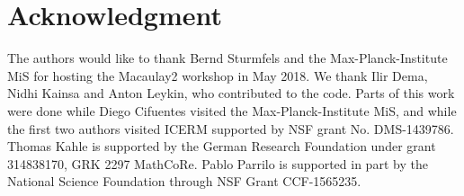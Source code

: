 \documentclass[11pt]{amsart}
\theoremstyle{plain}%
\theoremstyle{definition}
\theoremstyle{remark}
\newcommand{\Mac}{Macaulay2\xspace}
\begin{document}
\section*{Acknowledgment}
\label{sec:acknowledgement}
The authors would like to thank Bernd Sturmfels and the Max-Planck-Institute MiS for hosting the \Mac workshop in May 2018.
We thank Ilir Dema, Nidhi Kainsa and Anton Leykin, who contributed to the code.
Parts of this work were done while Diego Cifuentes visited the Max-Planck-Institute MiS, and while the first two authors visited ICERM supported by NSF grant No. DMS-1439786.
Thomas Kahle is supported by the German Research Foundation under grant 314838170, GRK 2297 MathCoRe.
Pablo Parrilo is supported in part by the National Science Foundation through NSF Grant CCF-1565235.



\end{document}

